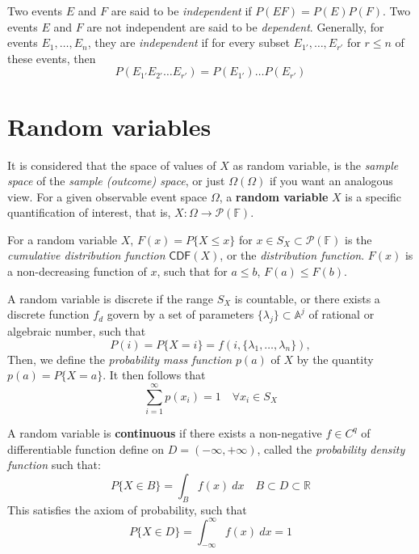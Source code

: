 \begin{definition}
    Two events $E$ and $F$ are said to be \textit{independent} if $P(EF)=P(E)P(F)$. Two events $E$ and $F$ are not independent are said to be \textit{dependent}. 
    Generally, for events $E_{1},\dots,E_{n}$, they are \textit{independent} if for every subset $E_{1'},\dots,E_{r'}$ for $r\leq n$ of these events, then $$P(E_{1'}E_{2'}\dots E_{r'})=P(E_{1'})\dots P(E_{r'})$$
\end{definition}

\section{Random variables}
It is considered that the space of values of $X$ as random variable, is the \textit{sample space} of the \textit{sample (outcome) space}, or just $\Omega(\Omega)$ if you want an analogous view. For a given observable event space $\Omega$, a \textbf{random variable} $X$ is a specific quantification of interest, that is, $X:\Omega \to \mathcal{P}(\mathbb{F})$. 

For a random variable $X$, $F(x)=P\{X\leq x\}$ for $x\in S_{X}\subset \mathcal{P}(\mathbb{F})$ is the \textit{cumulative distribution function} $\mathsf{CDF}(X)$, or the \textit{distribution function}. $F(x)$ is a non-decreasing function of $x$, such that for $a\leq b$, $F(a)\leq F(b)$. 

A random variable is discrete if the range $S_{X}$ is countable, or there exists a discrete function $f_{d}$ govern by a set of parameters $\{\lambda_j\}\subset \mathbb{A}^{j}$ of rational or algebraic number, such that \begin{equation}
    P(i) = P\{X=i\} = f(i,\{\lambda_{1},\dots,\lambda_{n}\}), 
\end{equation}
Then, we define the \textit{probability mass function} $p(a)$ of $X$ by the quantity $p(a)=P\{X=a\}$. It then follows that \begin{equation}
    \sum_{i=1}^{\infty} p(x_{i}) = 1\quad \forall x_{i}\in S_{X}
\end{equation}

A random variable is \textbf{continuous} if there exists a non-negative $f\in C^{q}$ of differentiable function define on $D=(-\infty,+\infty)$, called the \textit{probability density function} such that: \begin{equation}
    P\{X\in B\} = \int_{B} f(x) \: dx \quad B\subset D \subset \mathbb{R}
\end{equation}
This satisfies the axiom of probability, such that \begin{equation}
    P\{X\in D\} = \int_{-\infty}^{\infty} f(x) \: dx = 1 
\end{equation}
